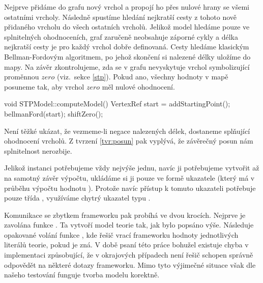 Nejprve přidáme do grafu nový vrchol a propojí ho přes nulové hrany se všemi ostatními vrcholy. Následně spustíme hledání nejkratší cesty z tohoto nově přidaného vrcholu do všech ostatních vrcholů. Jelikož model hledáme pouze ve splnitelných ohodnoceních, graf zaručeně neobsahuje záporné cykly a délka nejkratší cesty je pro každý vrchol dobře definovaná. Cesty hledáme klasickým Bellman-Fordovým algoritmem, po jehož skončení si nalezené délky uložíme do mapy. Na závěr zkontrolujeme, zda se v grafu nevyskytuje vrchol symbolizující proměnnou $zero$ (viz.~sekce \ref{stp}). Pokud ano, všechny hodnoty v mapě posuneme tak, aby vrchol $zero$ měl nulové ohodnocení.
\begin{code}
void STPModel::computeModel() {
	VertexRef start = addStartingPoint();
	bellmanFord(start);
	shiftZero();
}
\end{code}
Není těžké ukázat, že vezmeme-li negace nalezených délek, dostaneme splňující ohodnocení vrcholů. Z tvrzení \ref{tvr:posun} pak vyplývá, že závěrečný posun nám splnitelnost nerozbije.

Jelikož instanci  potřebujeme vždy nejvýše jednu, navíc ji potřebujeme vytvořit až na samotný závěr výpočtu, ukládáme si ji pouze ve formě ukazatele (který má v průběhu výpočtu hodnotu ). Protože navíc přístup k tomuto ukazateli potřebuje pouze třída , využíváme chytrý ukazatel typu .

Komunikace se zbytkem frameworku pak probíhá ve dvou krocích. Nejprve je zavolána funkce . Ta vytvoří model teorie tak, jak bylo popsáno výše. Následuje opakované volání funkce , kde řešič vrací frameworku hodnoty jednotlivých literálů teorie, pokud je zná. V době psaní této práce bohužel existuje chyba v implementaci  způsobující, že v okrajových případech není řešič schopen správně odpovědět na některé dotazy frameworku. Mimo tyto výjimečné situace však dle našeho testování funguje tvorba modelu korektně.
